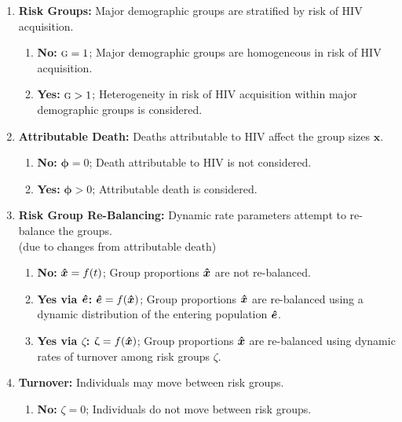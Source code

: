 \begin{fboxed}
  \begin{enumerate}[leftmargin=1em]
    \item \label{ass:risk-groups}\textbf{Risk Groups:}
    Major demographic groups are stratified by risk of HIV acquisition.
    \begin{enumerate}
      \item \label{ass:risk-groups-no}\textbf{No:} $\textsc{g} = 1$;
      Major demographic groups are homogeneous in risk of HIV acquisition.
      \item \label{ass:risk-groups-yes}\textbf{Yes:} $\textsc{g} > 1$;
      Heterogeneity in risk of HIV acquisition within major demographic groups is considered.
    \end{enumerate}
    \item \label{ass:attr-death}\textbf{Attributable Death:}
    Deaths attributable to HIV affect the group sizes $\bm{x}$.
    \begin{enumerate}
      \item \textbf{No:} $\bm{\phi} = 0$;
      Death attributable to HIV is not considered.
      \item \textbf{Yes:} $\bm{\phi} > 0$;
      Attributable death is considered.
    \end{enumerate}
    \item \label{ass:rebalance}\textbf{Risk Group Re-Balancing:}
    Dynamic rate parameters attempt to re-balance the groups.
    \\(due to changes from attributable death)
    \begin{enumerate}
      \item \textbf{No:} $\bm{\hat{x}} = f(t)$;
      Group proportions $\bm{\hat{x}}$ are not re-balanced.
      \item \textbf{Yes via $\bm{\hat{e}}$:} $\bm{\hat{e}} = f(\bm{\hat{x}})$;
      Group proportions $\bm{\hat{x}}$ are re-balanced using
      a dynamic distribution of the entering population $\bm{\hat{e}}$.
      \item \textbf{Yes via $\zeta$:} $\upzeta = f(\bm{\hat{x}})$;
      Group proportions $\bm{\hat{x}}$ are re-balanced using
      dynamic rates of turnover among risk groups $\zeta$.
    \end{enumerate}
    \item \label{ass:turnover}\textbf{Turnover:}
    Individuals may move between risk groups.
    \begin{enumerate}
      \item \textbf{No:} $\zeta = 0$;
      Individuals do not move between risk groups.

\end{enumerate}
\end{enumerate}
\end{fboxed}
